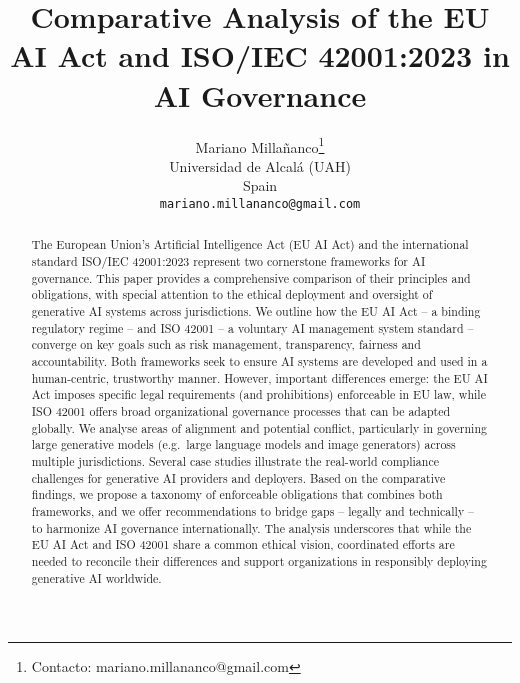 \documentclass{article}
\title{Comparative Analysis of the EU AI Act and ISO/IEC 42001:2023 in AI Governance}
\author{Mariano Millañanco\thanks{Contacto: mariano.millananco@gmail.com}\\
Universidad de Alcalá (UAH)\\
Spain\\
\texttt{mariano.millananco@gmail.com}}
\begin{document}
\maketitle

\begin{abstract}
The European Union’s Artificial Intelligence Act (EU AI Act) and the international standard ISO/IEC 42001:2023 represent two cornerstone frameworks for AI governance. This paper provides a comprehensive comparison of their principles and obligations, with special attention to the ethical deployment and oversight of generative AI systems across jurisdictions. We outline how the EU AI Act – a binding regulatory regime – and ISO 42001 – a voluntary AI management system standard – converge on key goals such as risk management, transparency, fairness and accountability. Both frameworks seek to ensure AI systems are developed and used in a human-centric, trustworthy manner. However, important differences emerge: the EU AI Act imposes specific legal requirements (and prohibitions) enforceable in EU law, while ISO 42001 offers broad organizational governance processes that can be adapted globally. We analyse areas of alignment and potential conflict, particularly in governing large generative models (e.g.\ large language models and image generators) across multiple jurisdictions. Several case studies illustrate the real-world compliance challenges for generative AI providers and deployers. Based on the comparative findings, we propose a taxonomy of enforceable obligations that combines both frameworks, and we offer recommendations to bridge gaps – legally and technically – to harmonize AI governance internationally. The analysis underscores that while the EU AI Act and ISO 42001 share a common ethical vision, coordinated efforts are needed to reconcile their differences and support organizations in responsibly deploying generative AI worldwide.
\end{abstract}


\end{document}
